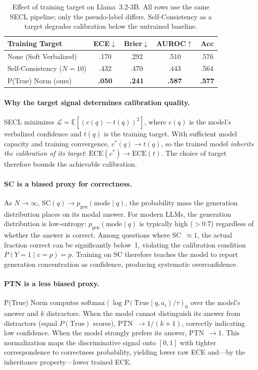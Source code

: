 \begin{table}[h]
\centering
\caption{Effect of training target on Llama~3.2-3B.
All rows use the same SECL pipeline; only the pseudo-label
differs. Self-Consistency as a target degrades calibration below
the untrained baseline.}
\label{tab:target_ablation}
\small
\begin{tabular}{@{}lcccc@{}}
\toprule
\textbf{Training Target}
  & \textbf{ECE}$\downarrow$ & \textbf{Brier}$\downarrow$
  & \textbf{AUROC}$\uparrow$ & \textbf{Acc} \\
\midrule
None (Soft Verbalized)     & .170 & .292 & .510 & .576 \\
Self-Consistency ($N{=}10$) & .432 & .470 & .443 & .564 \\
P(True) Norm (ours)        & \textbf{.050} & \textbf{.241} & \textbf{.587} & \textbf{.577} \\
\bottomrule
\end{tabular}
\end{table}

\paragraph{Why the target signal determines calibration quality.}
SECL minimizes $\mathcal{L} = \mathbb{E}[(c(q) - t(q))^2]$, where
$c(q)$ is the model's verbalized confidence and $t(q)$ is the
training target.
With sufficient model capacity and training convergence,
$c^*(q) \to t(q)$, so the trained model \emph{inherits the
calibration of its target}:
$\mathrm{ECE}(c^*) \to \mathrm{ECE}(t)$.
The choice of target therefore bounds the achievable calibration.

\paragraph{SC is a biased proxy for correctness.}
As $N \to \infty$, SC$(q) \to p_{\mathrm{gen}}(\text{mode} \mid q)$,
the probability mass the generation distribution places on its modal
answer.
For modern LLMs, the generation distribution is low-entropy:
$p_{\mathrm{gen}}(\text{mode} \mid q)$ is typically high
($>$0.7) regardless of whether the answer is correct.
Among questions where SC~$\approx 1$, the actual fraction correct
can be significantly below~1, violating the calibration condition
$P(Y{=}1 \mid c{=}p) = p$.
Training on SC therefore teaches the model to report generation
concentration as confidence, producing systematic overconfidence.

\paragraph{PTN is a less biased proxy.}
P(True) Norm computes $\mathrm{softmax}(\log P(\text{True} \mid
q, a_i) / \tau)_0$ over the model's answer and $k$ distractors.
When the model cannot distinguish its answer from distractors
(equal $P(\text{True})$ scores), PTN~$\to 1/(k{+}1)$,
correctly indicating low confidence.
When the model strongly prefers its answer,
PTN~$\to 1$.
This normalization maps the discriminative signal onto $[0,1]$
with tighter correspondence to correctness probability,
yielding lower raw ECE and---by the inheritance
property---lower trained ECE.

